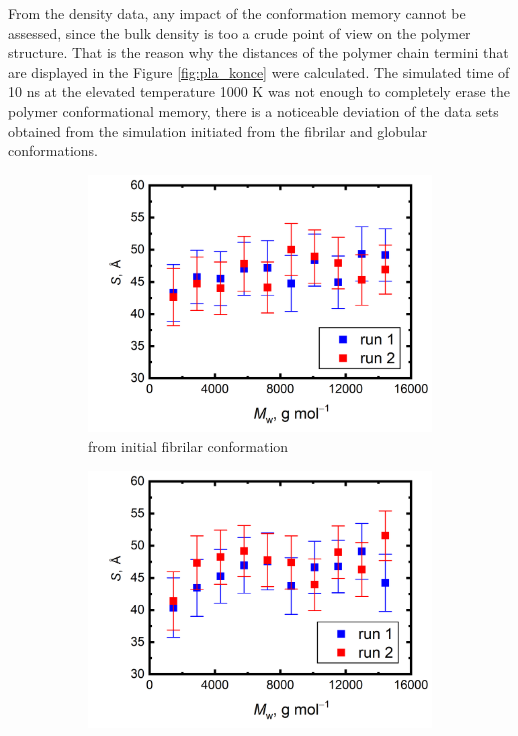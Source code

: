 From the density data, any impact of the conformation memory cannot be assessed, since the bulk density is too a crude point of view on the polymer structure. That is the reason why the distances of the polymer chain termini that are displayed in the Figure \ref{fig:pla_konce} were calculated. The simulated time of 10 ns at the elevated temperature 1000 K was not enough to completely erase the polymer conformational memory, there is a noticeable deviation of the data sets obtained from the simulation initiated from the fibrilar and globular conformations.

\begin{figure}[htb!]
	\begin{subfigure}{0.5\textwidth}
		\includegraphics[width=1.0\linewidth]{img/pla_linear_konce.png} 
		\caption{from initial fibrilar conformation}
		\vspace{-0.2cm}
		\label{fig:subim1}
	\end{subfigure}
	\begin{subfigure}{0.5\textwidth}
		\includegraphics[width=1.0\linewidth]{img/pla_glob_konce.png}

\end{subfigure}
\end{figure}
